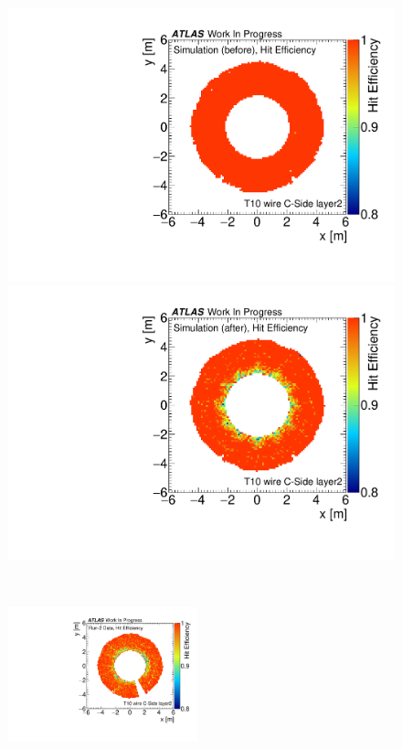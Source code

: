 \begin{figure}[tbp]
	\begin{minipage}{0.49\hsize}
	\centering
	\includegraphics[width=\textwidth,page=1]{img/plot/hit_eff_orin.pdf}
	\subcaption{}
	\end{minipage}
	\begin{minipage}{0.49\hsize}
	\centering
	\includegraphics[width=\textwidth,page=1]{img/plot/hit_eff_tune.pdf}
	\subcaption{}
	\end{minipage}\\
	\begin{minipage}{0.99\hsize}
	\centering
	\includegraphics[width=0.49\textwidth,page=1]{img/plot/hit_eff_data.pdf}

\end{minipage}
\end{figure}
